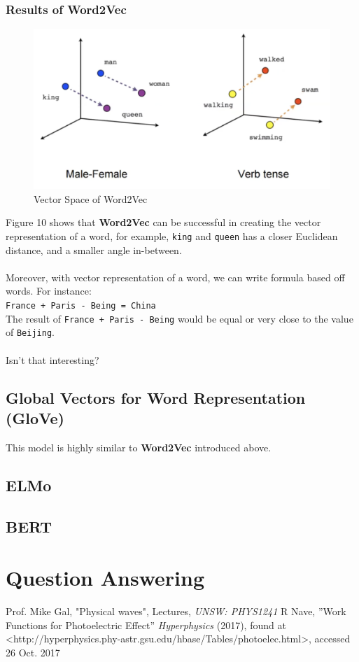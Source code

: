 \documentclass[paper=a4, fontsize=12pt]{scrartcl}
\begin{document}
\subsubsection{Results of Word2Vec}
 \begin{figure}
  \includegraphics[scale=0.7]{word2vectorresult.png}
  \caption{Vector Space of Word2Vec}
  \label{fig:skip-gram}
\end{figure}
Figure 10 shows that \textbf{Word2Vec} can be successful in creating the vector representation of a word, for example, \texttt{king} and \texttt{queen} has a closer Euclidean distance, and a smaller angle in-between.\\\\
Moreover, with vector representation of a word, we can write formula based off words. For instance: \\
\texttt{France + Paris - Being = China} \\
The result of \texttt{France + Paris - Being} would be equal or very close to the value of   \texttt{Beijing}. \\\\
Isn't that interesting?
\subsection{Global Vectors for Word Representation (GloVe)}
This model is highly similar to \textbf{Word2Vec} introduced above. 

\subsection{ELMo}
\subsection{BERT}
\section{Question Answering}




\clearpage

\begin{thebibliography}{99}
 Prof. Mike Gal, "Physical waves", Lectures, {\em UNSW: PHYS1241}
 R Nave, ''Work Functions for Photoelectric Effect'' {\em Hyperphysics} (2017), found at <http://hyperphysics.phy-astr.gsu.edu/hbase/Tables/photoelec.html>, accessed 26 Oct. 2017

\end{thebibliography}
\end{document}
